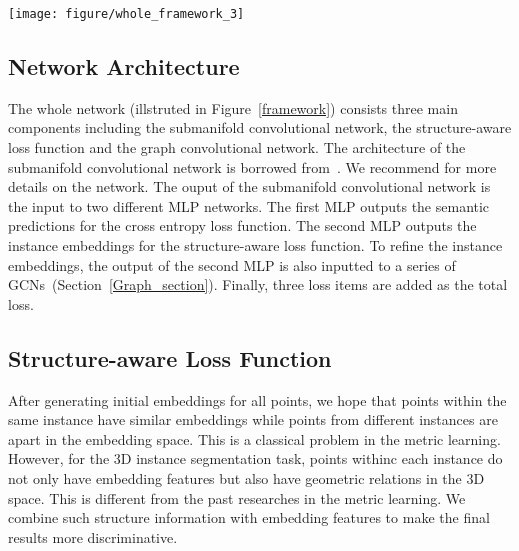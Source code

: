 \documentclass{article}
\begin{document}
\begin{figure*}[!t]
	\centering
	\texttt{[image: figure/whole\_framework\_3]}
	\caption{Illustration of the whole network architecture. The input is the original point coordinate with RGB attributes. The output of the submanifold network is the initial embedding for each point. Then two MLPs are followed to generate the semantic prediction and the instance embedding respectively. The number of the semantic class is C and the dimension of the instance embedding is 4 in our paper. Two GCNs are used to refine the instance embedding. The embedding generated by  and the refined embedding optimized by GCNs are both used to calculate the structure-aware loss respectively. The final training process is a multi-task learning. }
	\label{framework}
\end{figure*}


\subsection{Network Architecture} \label{Network_section}
The whole network (illstruted in Figure~\ref{framework}) consists three main components including the submanifold convolutional network, the structure-aware loss function and the graph convolutional network. The architecture of the submanifold convolutional network is borrowed from~\cite{graham20183d}. We recommend \cite{graham20183d} for more details on the network. The ouput of the submanifold convolutional network is the input to two different MLP networks. The first MLP outputs the semantic predictions for the cross entropy loss function. The second MLP outputs the instance embeddings for the structure-aware loss function. To refine the instance embeddings, the output of the second MLP is also inputted to a series of GCNs~(Section~\ref{Graph_section}). Finally, three loss items are added as the total loss.

\subsection{Structure-aware Loss Function} \label{Structure_section}
After generating initial embeddings for all points, we hope that points within the same instance have similar embeddings while points from different instances are apart in the embedding space. This is a classical problem in the metric learning. However, for the 3D instance segmentation task, points withinc each instance do not only have embedding features but also have geometric relations in the 3D space. This is different from the past researches in the metric learning. We combine such structure information with embedding features to make the final results more discriminative.
\end{document}
